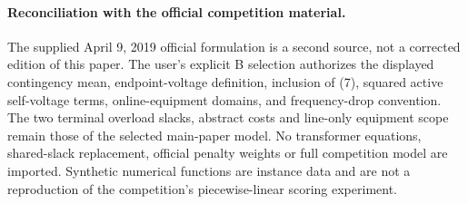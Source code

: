 \documentclass{article}
\begin{document}
\paragraph{Reconciliation with the official competition material.}
The supplied April 9, 2019 official formulation is a second source, not a corrected edition of this paper. The user's explicit B selection authorizes the displayed contingency mean, endpoint-voltage definition, inclusion of (7), squared active self-voltage terms, online-equipment domains, and frequency-drop convention. The two terminal overload slacks, abstract costs and line-only equipment scope remain those of the selected main-paper model. No transformer equations, shared-slack replacement, official penalty weights or full competition model are imported. Synthetic numerical functions are instance data and are not a reproduction of the competition's piecewise-linear scoring experiment.
\end{document}
